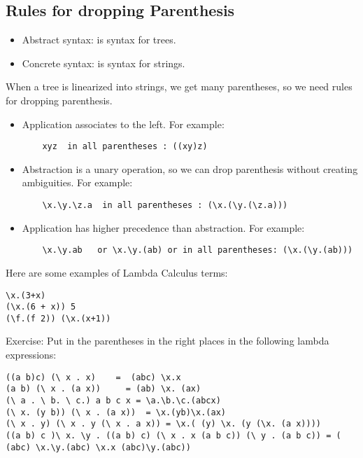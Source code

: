 \documentclass{article}
\begin{document}
 \subsection{Rules for dropping Parenthesis}                            
\begin{itemize}
  \item Abstract syntax: is syntax for trees.
  \item Concrete syntax: is syntax for strings.
\end{itemize}
When a tree is linearized into strings, we get many parentheses, so we need rules for dropping parenthesis.
\begin{itemize}
  \item Application associates to the left.
  \newline For example:
  \begin{lstlisting}
    xyz  in all parentheses : ((xy)z)
  \end{lstlisting} 
  \item Abstraction is a unary operation, so we can drop parenthesis without creating ambiguities.
    \newline For example:
    \begin{lstlisting}
    \x.\y.\z.a  in all parentheses : (\x.(\y.(\z.a)))
 \end{lstlisting} 
 \item Application has higher precedence than abstraction.
    \newline For example:
    \begin{lstlisting}
    \x.\y.ab   or \x.\y.(ab) or in all parentheses: (\x.(\y.(ab)))
 \end{lstlisting} 
\end{itemize}
Here are some examples of Lambda Calculus terms:
\begin{lstlisting}
\x.(3+x)  
(\x.(6 + x)) 5 
(\f.(f 2)) (\x.(x+1))
 \end{lstlisting} 
Exercise: Put in the parentheses in the right places in the following lambda expressions:
\begin{lstlisting}
((a b)c) (\ x . x)    =  (abc) \x.x
(a b) (\ x . (a x))     = (ab) \x. (ax)
(\ a . \ b. \ c.) a b c x = \a.\b.\c.(abcx)
(\ x. (y b)) (\ x . (a x))  = \x.(yb)\x.(ax)
(\ x . y) (\ x . y (\ x . a x)) = \x.( (y) \x. (y (\x. (a x))))
((a b) c )\ x. \y . ((a b) c) (\ x . x (a b c)) (\ y . (a b c)) = ( (abc) \x.\y.(abc) \x.x (abc)\y.(abc))
 \end{lstlisting} 
\end{document}
